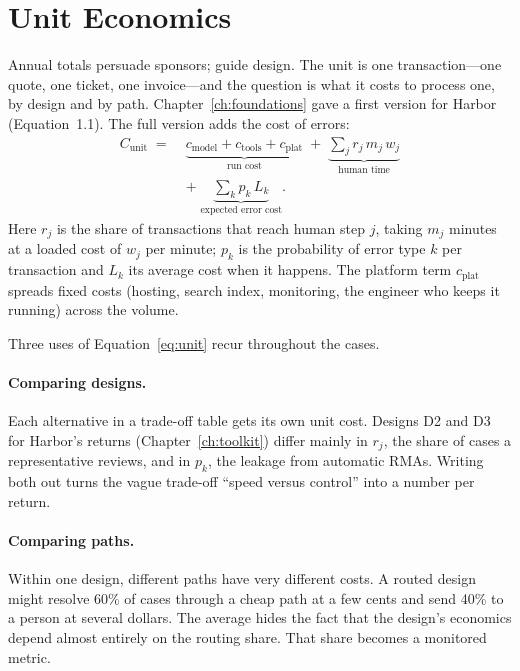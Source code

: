 \section{Unit Economics}
\label{sec:unit-econ}

Annual totals persuade sponsors;  guide design. The unit is one transaction---one quote, one ticket, one invoice---and the question is what it costs to process one, by design and by path. Chapter~\ref{ch:foundations} gave a first version for Harbor (Equation~1.1). The full version adds the cost of errors:
\begin{equation}
  \begin{split}
  C_{\text{unit}} \;=\; & \underbrace{c_{\text{model}} + c_{\text{tools}} + c_{\text{plat}}}_{\text{run cost}}
  \;+\; \underbrace{\sum_{j} r_j \, m_j \, w_j}_{\text{human time}} \\
  & +\; \underbrace{\sum_{k} p_k \, L_k}_{\text{expected error cost}} .
  \end{split}
  \label{eq:unit}
\end{equation}
Here $r_j$ is the share of transactions that reach human step $j$, taking $m_j$ minutes at a loaded cost of $w_j$ per minute; $p_k$ is the probability of error type $k$ per transaction and $L_k$ its average cost when it happens. The platform term $c_{\text{plat}}$ spreads fixed costs (hosting, search index, monitoring, the engineer who keeps it running) across the volume.

Three uses of Equation~\eqref{eq:unit} recur throughout the cases.

\paragraph{Comparing designs.} Each alternative in a trade-off table gets its own unit cost. Designs D2 and D3 for Harbor's returns (Chapter~\ref{ch:toolkit}) differ mainly in $r_j$, the share of cases a representative reviews, and in $p_k$, the leakage from automatic RMAs. Writing both out turns the vague trade-off ``speed versus control'' into a number per return.

\paragraph{Comparing paths.} Within one design, different paths have very different costs. A routed design might resolve 60\% of cases through a cheap path at a few cents and send 40\% to a person at several dollars. The average hides the fact that the design's economics depend almost entirely on the routing share. That share becomes a monitored metric.

